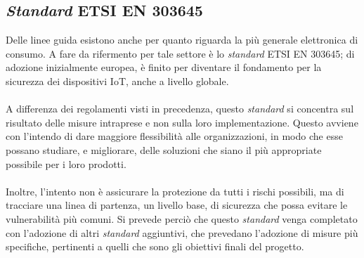\subsection{\textit{Standard} ETSI EN 303645}
\noindent
Delle linee guida esistono anche per quanto riguarda la più generale elettronica di consumo.
A fare da rifermento per tale settore è lo \textit{standard} ETSI EN 303645; di adozione inizialmente europea, è finito per diventare il fondamento per la sicurezza dei dispositivi \gls{IoT}, anche a livello globale.\\\\
A differenza dei regolamenti visti in precedenza, questo \textit{standard} si concentra sul risultato delle misure intraprese e non sulla loro implementazione.
Questo avviene con l'intendo di dare maggiore flessibilità alle organizzazioni, in modo che esse possano studiare, e migliorare, delle soluzioni che siano il più appropriate possibile per i loro prodotti.\\\\
Inoltre, l'intento non è assicurare la protezione da tutti i rischi possibili, ma di tracciare una linea di partenza, un livello base, di sicurezza che possa evitare le vulnerabilità più comuni.
Si prevede perciò che questo \textit{standard} venga completato con l'adozione di altri \textit{standard} aggiuntivi, che prevedano l'adozione di misure più specifiche, pertinenti a quelli che sono gli obiettivi finali del progetto.

